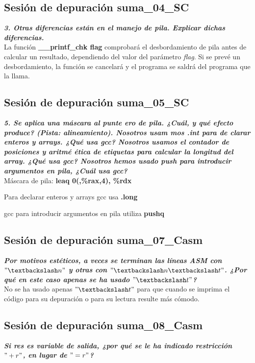 \subsection{Sesión de depuración suma\_04\_SC}
\textbf{\textit{3. Otras diferencias están en el manejo de pila. Explicar dichas diferencias.}}
\\

La función \textbf{\_\_printf\_chk flag} comprobará el desbordamiento de pila antes de calcular un resultado, dependiendo del valor del parámetro \textit{flag}. Si se prevé un desbordamiento, la función se cancelará y el programa se saldrá del programa que la llama.

\subsection{Sesión de depuración suma\_05\_SC}
\textbf{\textit{5. Se aplica una máscara 
		al punte ero de pila. ¿Cuál, 
		y  qué efecto produce? (Pista: alineamiento). 
		Nosotros usam
		mos .int para de clarar enteros y arrays. ¿Qué usa 
		gcc? Nosotros usamos el contador de posiciones y aritmé
		ética de etiquetas para calcular la longitud del array. ¿Qué usa gcc? Nosotros hemos usado push para introducir argumentos en pila, ¿Cuál usa gcc? 
}}
\\

Máscara de pila: \textbf{leaq	0(,\%rax,4), \%rdx}

Para declarar enteros y arrays gcc usa \textbf{.long}

gcc para introducir argumentos en pila utiliza \textbf{pushq}

\subsection{Sesión de depuración suma\_07\_Casm}
\textbf{\textit{Por motivos estéticos, a veces se terminan las líneas ASM con $ "\textbackslash n" $ y otras con $ "\textbackslash n \textbackslash t" $.  
		¿Por qué en este caso apenas se ha usado $ "\textbackslash t" $?}}
	\\
	
	No se ha usado apenas $ "\textbackslash t" $ para que cuando se imprima el código para su depuración o para su lectura resulte más cómodo.

\subsection{Sesión de depuración suma\_08\_Casm}
\textbf{\textit{Si res es variable de salida, ¿por qué se le ha indicado restricción $ "+r" $, en lugar de $ "=r" $? 
}}
\\

